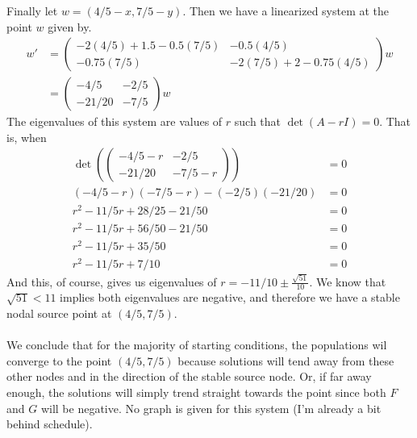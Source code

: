 \documentclass{article}
\theoremstyle{definition}
\begin{document}
        Finally let $w = (4/5-x, 7/5-y)$. Then we have a linearized system at the point $w$ given by.
        \begin{align*}
            w' &= \begin{pmatrix}
                -2(4/5) + 1.5 - 0.5(7/5) & -0.5(4/5) \\
                -0.75(7/5) & -2(7/5) + 2 - 0.75(4/5)
            \end{pmatrix} w \\
            &= \begin{pmatrix}
                -4/5 & -2/5 \\
                -21/20 & -7/5
            \end{pmatrix}
            w
        \end{align*}
        The eigenvalues of this system are values of $r$ such that $\det(A - rI) = 0$.
        That is, when 
        \begin{align*}
            \det\left(
                \begin{pmatrix}
                    -4/5 - r & -2/5 \\
                    -21/20 & -7/5 - r
                \end{pmatrix}
            \right) &= 0 \\
            (-4/5 - r)(-7/5 - r) - (-2/5)(-21/20) &= 0 \\
            r^2 - 11/5 r + 28/25 - 21/50 &= 0 \\
            r^2 - 11/5 r + 56/50 - 21/50 &= 0 \\
            r^2 - 11/5 r + 35/50 &= 0 \\
            r^2 - 11/5 r + 7/10 &= 0
        \end{align*}
        And this, of course, gives us eigenvalues of 
        $r = -11/10 \pm \frac{\sqrt{51}}{10}$.
        We know that $\sqrt{51} < 11$ implies both eigenvalues are negative,
        and therefore we have a stable nodal source point at $(4/5, 7/5)$.
        \\\\
        We conclude that for the majority of starting conditions, the populations 
        wil converge to the point $(4/5, 7/5)$ because solutions will tend away 
        from these other nodes and in the direction of the stable source node.
        Or, if far away enough, the solutions will simply trend straight towards 
        the point since both $F$ and $G$ will be negative. No graph is given for this 
        system (I'm already a bit behind schedule).
\end{document}
